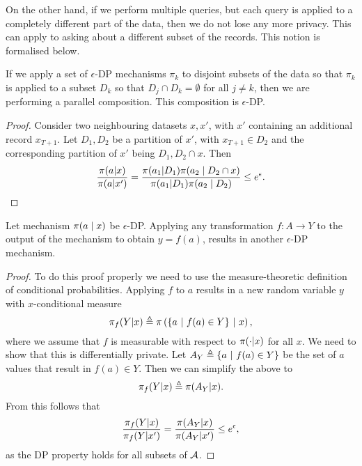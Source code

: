 \begin{frame}
{    On the other hand, if we perform multiple queries, but each query is applied to a completely different part of the data, then we do not lose any more privacy. This can apply to asking about a different subset of the records. This notion is formalised below.}
  \begin{theorem}
    If we apply a set of $\epsilon$-DP mechanisms $\pi_k$ to disjoint subsets of the data so that $\pi_k$ is applied to a subset $D_k$ so that $D_j \cap D_k  = \emptyset$ for all $j \neq k$, then we are performing a parallel composition. This composition is $\epsilon$-DP.
  \end{theorem}
  \begin{proof}
    Consider two neighbouring datasets $x, x'$, with $x'$ containing an additional record $x_{T+1}$.
    Let $D_1, D_2$ be a partition of $x'$, with $x_{T+1} \in D_2$ and the corresponding partition of $x'$ being $D_1, D_2 \cap x$. Then
    \[
      \frac{\pi(a | x)}{\pi(a | x')}
      =
      \frac{\pi(a_1 | D_1) \pi(a_2 \mid D_2 \cap x)}{\pi(a_1 | D_1) \pi(a_2 \mid D_2)}
      \leq
      e^\epsilon.
    \]
  \end{proof}
  \begin{theorem}
    Let mechanism $\pi(a \mid x)$ be $\epsilon$-DP. Applying any transformation $f : A \to Y$ to the output of the mechanism to obtain $y = f(a)$, results in another $\epsilon$-DP mechanism.
  \end{theorem}
  \begin{proof}
    To do this proof properly we need to use the measure-theoretic definition of conditional probabilities. Applying $f$ to $a$ results in a new random variable $y$ with $x$-conditional measure
    \[
      \pi_f(Y | x) \mathrel{\triangleq} \pi\left(\left\{a ~\middle|~ f(a) \in Y\right\} ~\middle|~ x \right),
    \]
    where we assume that $f$ is measurable with respect to $\pi( \cdot | x)$ for all $x$.
    We need to show that this is differentially private. Let $A_Y \mathrel{\triangleq} \left\{a ~\middle|~ f(a) \in Y\right\}$ be the set of $a$ values that result in $f(a) \in Y$. Then we can simplify the above to
    \[
      \pi_f(Y | x) \mathrel{\triangleq} \pi(A_Y | x).
    \]
    From this follows that
    \[
      \frac{\pi_f(Y | x)}{\pi_f(Y | x')}
      = \frac{\pi(A_Y | x)}{\pi(A_Y | x')}
      \leq e^\epsilon,
    \]
    as the DP property holds for all subsets of ${\mathcal{A}}$.


\end{proof}
\end{frame}
